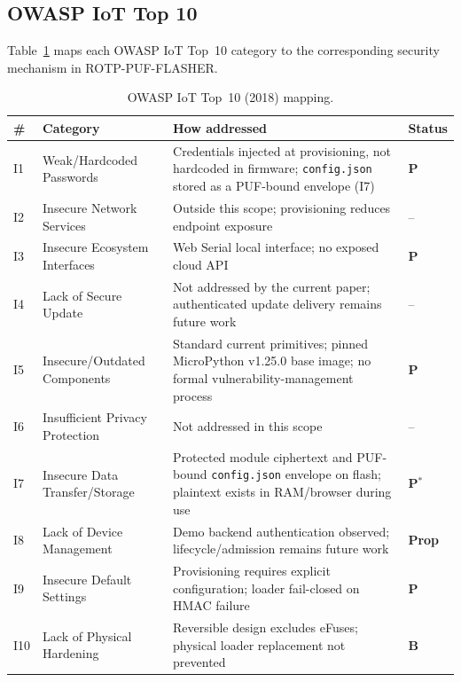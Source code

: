 \documentclass[runningheads]{llncs}
\begin{document}
\subsection{OWASP IoT Top 10}

Table~\ref{tab:owasp} maps each OWASP IoT Top~10 category to the corresponding security mechanism in ROTP-PUF-FLASHER.

\begin{table}[ht]
\caption{OWASP IoT Top~10 (2018) mapping.}
\label{tab:owasp}
\centering
\setlength{\tabcolsep}{3pt}
\begin{tabularx}{\linewidth}{llXl}
\toprule
\# & Category & How addressed & Status \\
\midrule
I1 & Weak/Hardcoded Passwords
   & Credentials injected at provisioning, not hardcoded in firmware; \texttt{config.json} stored as a PUF-bound envelope (I7)
   & \textbf{P} \\
I2 & Insecure Network Services
   & Outside this scope; provisioning reduces endpoint exposure
   & -- \\
I3 & Insecure Ecosystem Interfaces
   & Web Serial local interface; no exposed cloud API
   & \textbf{P} \\
I4 & Lack of Secure Update
   & Not addressed by the current paper; authenticated update delivery remains future work
   & -- \\
I5 & Insecure/Outdated Components
   & Standard current primitives; pinned MicroPython v1.25.0 base image; no formal vulnerability-management process
   & \textbf{P} \\
I6 & Insufficient Privacy Protection
   & Not addressed in this scope
   & -- \\
I7 & Insecure Data Transfer/Storage
   & Protected module ciphertext and PUF-bound \texttt{config.json} envelope on flash; plaintext exists in RAM/browser during use
   & \textbf{P}$^*$ \\
I8 & Lack of Device Management
   & Demo backend authentication observed; lifecycle/admission remains future work
   & \textbf{Prop} \\
I9 & Insecure Default Settings
   & Provisioning requires explicit configuration; loader fail-closed on HMAC failure
   & \textbf{P} \\
I10 & Lack of Physical Hardening
   & Reversible design excludes eFuses; physical loader replacement not prevented
   & \textbf{B} \\
\bottomrule
\end{tabularx}
\end{table}
\end{document}
